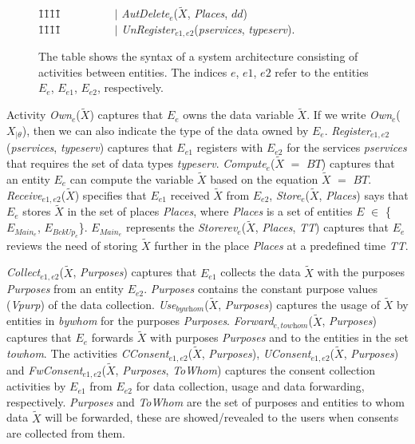 \documentclass[a4paper]{article}
\begin{document}
\begin{figure}[htbp]
{\begin{minipage}{11.87 cm}
\begin{tabbing}
\=1\=1\=1\=1\= \kill
\>\>\ \ \ \ \ \ \ \ \
		$|$ \textit{AutDelete}$_{e}$($\tilde{X}$, \textit{Places}, $dd$)\\ 
		\=1\=1\=1\=1\= \kill
\>\>\ \ \ \ \ \ \ \ \
		$|$ \textit{UnRegister}$_{e1,e2}$(\textit{pservices}, \textit{typeserv}).
\end{tabbing}
\end{minipage}
}
\caption{The table shows the syntax of a system architecture consisting of activities between entities. The indices $e$, $e1$, $e2$ refer to the entities $E_e$, $E_{e1}$, $E_{e2}$, respectively.}\label{fig:sysarch}
\end{figure}


Activity \textit{Own}$_{e}$($\tilde{X}$) captures that $E_e$ owns the data variable $\tilde{X}$. If we write \textit{Own}$_{e}$($X_{|\theta}$), then we can also indicate the type of the data owned by $E_e$. \textit{Register}$_{e1,e2}$(\textit{pservices}, \textit{typeserv}) captures that $E_{e1}$ registers with $E_{e2}$ for the services \textit{pservices} that requires the set of data types \textit{typeserv}. \textit{Compute}$_{e}$($\tilde{X}$ $=$ $BT$) captures that an entity $E_e$ can compute the variable $\tilde{X}$ based on the equation $\tilde{X}$ $=$ $BT$. \textit{Receive}$_{e1, e2}$($\tilde{X}$) specifies that $E_{e1}$ received $\tilde{X}$ from $E_{e2}$,    
\textit{Store}$_{e}$($\tilde{X}$, \textit{Places}) says that $E_e$ stores $\tilde{X}$ in the set of places \textit{Places}, where \textit{Places} is a set of entities $E$ $\in$ \{$E_{\textit{Main}_e}$, $E_{\textit{BckUp}_e}$\}. $E_{\textit{Main}_e}$ represents the  \textit{Storerev}$_{e}$($\tilde{X}$, \textit{Places}, \textit{TT}) captures that $E_e$ reviews the need of storing $\tilde{X}$ further in the place \textit{Places} at a predefined time \textit{TT}. 

\textit{Collect}$_{e1, e2}$($\tilde{X}$, \textit{Purposes}) captures that $E_{e1}$ collects the data $\tilde{X}$ with the purposes \textit{Purposes} from an entity $E_{e2}$. \textit{Purposes} contains the constant purpose values (\textit{Vpurp}) of the data collection. \textit{Use}$_{\textit{bywhom}}$($\tilde{X}$, \textit{Purposes}) captures the usage of $\tilde{X}$ by entities in \textit{bywhom} for the purposes \textit{Purposes}. \textit{Forward}$_{e,\textit{towhom}}$($\tilde{X}$, \textit{Purposes}) captures that $E_{e}$ forwards $\tilde{X}$ with purposes \textit{Purposes} and to the entities in the set \textit{towhom}.  The activities \textit{CConsent}$_{e1, e2}$($\tilde{X}$, \textit{Purposes}), \textit{UConsent}$_{e1, e2}$($\tilde{X}$, \textit{Purposes}) and \textit{FwConsent}$_{e1, e2}$($\tilde{X}$, \textit{Purposes}, \textit{ToWhom}) captures the consent collection activities by $E_{e1}$ from $E_{e2}$ for data collection, usage and data forwarding, respectively. \textit{Purposes} and \textit{ToWhom} are the set of purposes and entities to whom data $\tilde{X}$ will be forwarded, these are showed/revealed to the users when consents are collected from them.  
\end{document}
